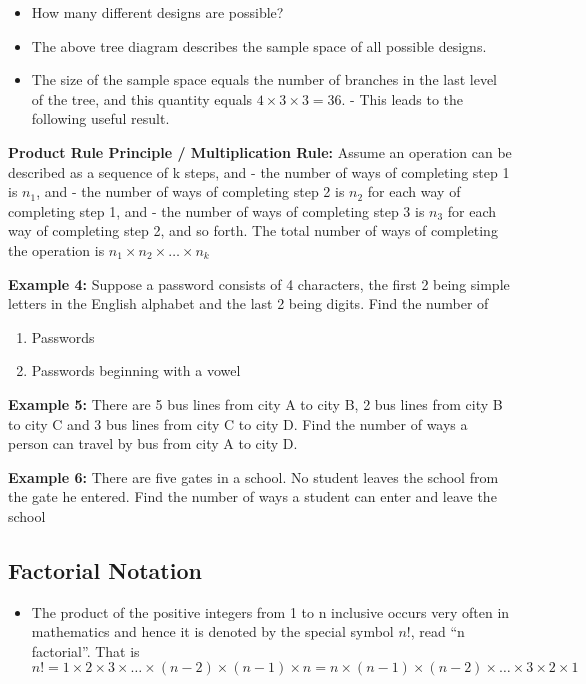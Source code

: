 \documentclass[]{book}
\providecommand{\tightlist}{%
  \setlength{\itemsep}{0pt}\setlength{\parskip}{0pt}}
\begin{document}
\begin{itemize}
\item
  How many different designs are possible?
\item
  The above tree diagram describes the sample space of all possible designs.
\item
  The size of the sample space equals the number of branches in the last level of the tree, and this quantity equals \(4 \times 3 \times 3 = 36\). - This leads to the following useful result.
\end{itemize}

\textbf{Product Rule Principle / Multiplication Rule:} Assume an operation can be described as a sequence of k steps, and
- the number of ways of completing step 1 is \(n_1\), and
- the number of ways of completing step 2 is \(n_2\) for each way of completing step 1, and
- the number of ways of completing step 3 is \(n_3\) for each way of completing step 2, and so forth.
The total number of ways of completing the operation is \(n_1\times n_2 \times \dots \times n_k\)

\textbf{Example 4:} Suppose a password consists of 4 characters, the first 2 being simple letters in the English alphabet and the last 2 being digits. Find the number of

\begin{enumerate}
\def\labelenumi{(\alph{enumi})}
\item
  Passwords
\item
  Passwords beginning with a vowel
\end{enumerate}

\textbf{Example 5:} There are 5 bus lines from city A to city B, 2 bus lines from city B to city C and 3 bus lines from city C to city D. Find the number of ways a person can travel by bus from city A to city D.

\textbf{Example 6:} There are five gates in a school. No student leaves the school from the gate he entered. Find the number of ways a student can enter and leave the school

\hypertarget{factorial-notation}{%
\subsection{Factorial Notation}\label{factorial-notation}}

\begin{itemize}
\tightlist
\item
  The product of the positive integers from 1 to n inclusive occurs very often in mathematics and hence it is denoted by the special symbol \(n!\), read ``n factorial''. That is
  \[n! = 1\times2\times3\times \dots \times(n-2)\times(n-1)\times n = n\times (n-1)\times(n-2)\times\dots \times 3 \times 2 \times 1 \]
\end{itemize}
\end{document}
